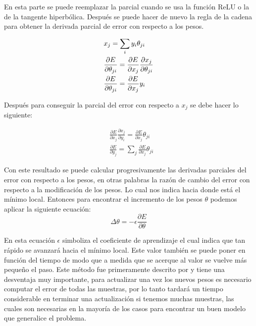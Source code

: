 \par En esta parte se puede reemplazar la parcial cuando se usa la función \gls{ReLU} o la de la tangente hiperbólica. Después se puede hacer de nuevo la regla de la cadena para obtener la derivada parcial de error con respecto a los pesos.
			
\begin{spreadlines}{10pt}
	\begin{alignat}{3}
		  & x_{j}=\sum_{i} y_{i}\theta_{ji}                                                                                          \\ \vspace{100pt}
		  & \frac{\partial E}{\partial \theta _{ji}} =\frac{\partial E}{\partial x_{j}} \frac{\partial x_{j}}{\partial \theta _{ji}} \\
		  & \frac{\partial E}{\partial \theta _{ji}} =\frac{\partial E}{\partial x_{j}}y_{i}                                         
	\end{alignat}
\end{spreadlines}
			
\par Después para conseguir la parcial del error con respecto a $x_{j}$ se debe hacer lo siguiente:
			
\begin{spreadlines}{10pt}
	\begin{alignat}{3}
		  & \frac{\partial E}{\partial x_{j}} \frac{\partial x_{j}}{\partial y_{i}} =\frac{\partial E}{\partial x_{j}} \theta _{ji} \\
		  & \frac{\partial E}{\partial y_{j}} =\sum _{j}\frac{\partial E}{\partial x_{j}} \theta _{ji}                              
	\end{alignat}
\end{spreadlines}
			
\par Con este resultado se puede calcular progresivamente las derivadas parciales del error con respecto a los pesos, en otras palabras la razón de cambio del error con respecto a la modificación de los pesos. Lo cual nos indica hacia donde está el mínimo local. Entonces para encontrar el incremento de los pesos $\theta$ podemos aplicar la siguiente ecuación:
\[ \Delta \theta =-\epsilon \frac{\partial E}{\partial \theta }\]
			
\par En esta ecuación $\epsilon$ simboliza el coeficiente de aprendizaje el cual indica que tan rápido se avanzará hacia el mínimo local. Este valor también se puede poner en función del tiempo de modo que a medida que se acerque al valor se vuelve más pequeño el paso. Este método fue primeramente descrito por \cite{rumelhart1986learning} y tiene una desventaja muy importante, para actualizar una vez los nuevos pesos es necesario computar el error de todas las muestras, por lo tanto tardará un tiempo considerable en terminar una actualización si tenemos muchas muestras, las cuales son necesarias en la mayoría de los casos para encontrar un buen modelo que generalice el problema. 

